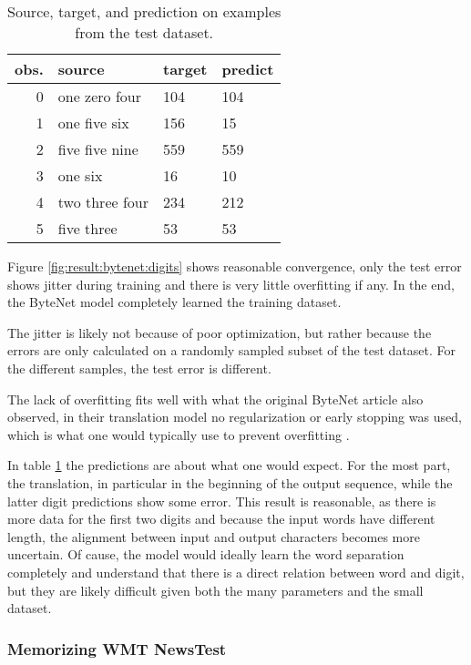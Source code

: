 \begin{table}[h]
\centering
\begin{tabular}{r|p{3.3cm} p{3.3cm} p{3.3cm}}
	obs. & source & target & predict\\ \hline
  0 & one zero four & 104 & 104 \\
  1 & one five six & 156 & 15 \\
  2 & five five nine & 559 & 559 \\
  3 & one six & 16 & 10 \\
  4 & two three four & 234 & 212 \\
  5 & five three & 53 & 53
\end{tabular}
\caption{Source, target, and prediction on examples from the test dataset.}
\label{table:result:bytenet:digits}
\end{table}

Figure \ref{fig:result:bytenet:digits} shows reasonable convergence, only the test error shows jitter during training and there is very little overfitting if any. In the end, the ByteNet model completely learned the training dataset.

The jitter is likely not because of poor optimization, but rather because the errors are only calculated on a randomly sampled subset of the test dataset. For the different samples, the test error is different.

The lack of overfitting fits well with what the original ByteNet article also observed, in their translation model no regularization or early stopping was used, which is what one would typically use to prevent overfitting \cite{bytenet}.

In table \ref{table:result:bytenet:digits} the predictions are about what one would expect. For the most part, the translation, in particular in the beginning of the output sequence, while the latter digit predictions show some error. This result is reasonable, as there is more data for the first two digits and because the input words have different length, the alignment between input and output characters becomes more uncertain. Of cause, the model would ideally learn the word separation completely and understand that there is a direct relation between word and digit, but they are likely difficult given both the many parameters and the small dataset.

\clearpage
\subsubsection{Memorizing WMT NewsTest}

